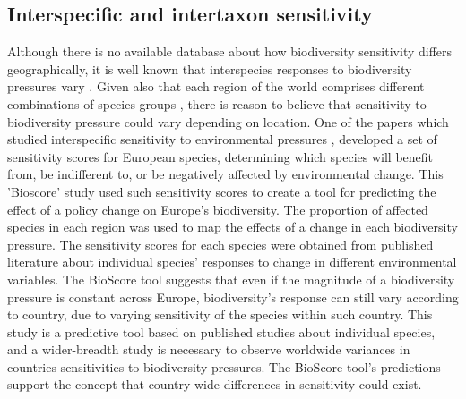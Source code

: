 \documentclass[11pt, a4paper, titlepage]{article}
\begin{document}
   	 \subsection*{Interspecific and intertaxon sensitivity}
   	 Although there is no available database about how biodiversity sensitivity differs geographically, it is well known that interspecies responses to biodiversity pressures vary \citep{foden2013identifying}. Given also that each region of the world comprises different combinations of species groups \citep{goethem2021biodiversity}, there is reason to believe that sensitivity to biodiversity pressure could vary depending on location. One of the papers which studied interspecific sensitivity to environmental pressures \citep{louette2010bioscore}, developed a set of sensitivity scores for European species, determining which species will benefit from, be indifferent to, or be negatively affected by environmental change. This 'Bioscore' study used such sensitivity scores to create a tool for predicting the effect of a policy change on Europe's biodiversity. The proportion of affected species in each region was used to map the effects of a change in each biodiversity pressure. The sensitivity scores for each species were obtained from published literature about individual species' responses to change in different environmental variables. The BioScore tool suggests that even if the magnitude of a biodiversity pressure is constant across Europe, biodiversity's response can still vary according to country, due to varying sensitivity of the species within such country. This study is a predictive tool based on published studies about individual species, and a wider-breadth study is necessary to observe worldwide variances in countries sensitivities to biodiversity pressures. The BioScore tool's predictions support the concept that country-wide differences in sensitivity could exist. \newline
   	 
\end{document}
